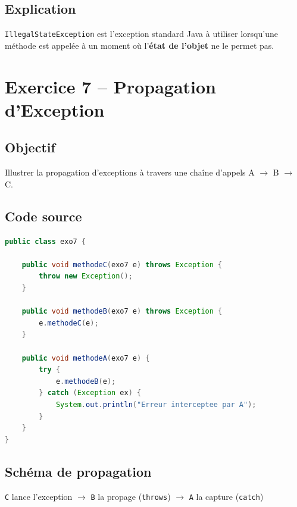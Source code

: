 \subsection{Explication}

\texttt{IllegalStateException} est l'exception standard Java à utiliser
lorsqu'une méthode est appelée à un moment où l'\textbf{état de l'objet}
ne le permet pas.

\section{Exercice 7 -- Propagation d'Exception}

\subsection{Objectif}

Illustrer la propagation d'exceptions à travers une chaîne d'appels
A $\rightarrow$ B $\rightarrow$ C.

\subsection{Code source}

\begin{lstlisting}[language=Java, caption={exo7.java -- Propagation}]
public class exo7 {

    public void methodeC(exo7 e) throws Exception {
        throw new Exception();
    }

    public void methodeB(exo7 e) throws Exception {
        e.methodeC(e);
    }

    public void methodeA(exo7 e) {
        try {
            e.methodeB(e);
        } catch (Exception ex) {
            System.out.println("Erreur interceptee par A");
        }
    }
}
\end{lstlisting}

\subsection{Schéma de propagation}

\begin{infobox}
    \centering\vspace{0.2cm}
    {\large \texttt{C} lance l'exception $\rightarrow$ \texttt{B} la propage
    (\texttt{throws}) $\rightarrow$ \texttt{A} la capture (\texttt{catch})}
    \vspace{0.2cm}
\end{infobox}


